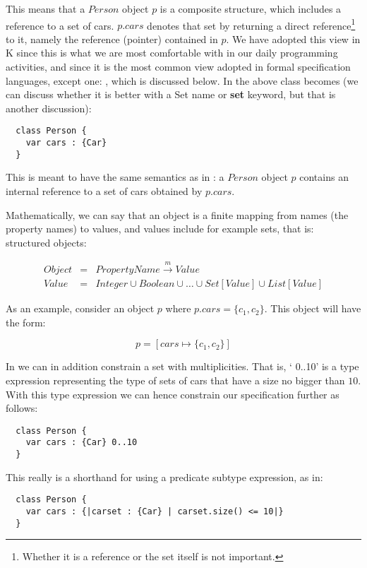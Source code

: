 \documentclass{llncs}
\begin{document}
\noindent
This means that a $Person$ object $p$ is a composite structure, which includes 
a reference to a set of cars. $p.cars$ denotes that set by returning a direct reference\footnote{Whether it is a reference or the set itself is not important.} to it, namely the reference (pointer) contained in $p$. 
We have adopted this view in K since this is what we are most comfortable with in our daily  programming activities, and since it is the most common
view adopted in formal specification languages, except one: \alloy{}, 
which is discussed below. In \klang{} the above class becomes (we can discuss whether it is better with a Set name or {\bf set} keyword, but that is another discussion):

\sk
\begin{lstlisting}
  class Person {
    var cars : {Car}
  }
\end{lstlisting}

\noindent
This is meant to have the same semantics as in \scala: a $Person$ object $p$ contains an internal reference to a set of cars obtained by $p.cars$. 

Mathematically, we can say that an object is a finite mapping from names (the property names) to values, and values include for example sets, that is: structured objects:

\begin{eqnarray}
  Object &=& PropertyName \stackrel{m}{\rightarrow} Value\\
  Value &=& Integer \cup Boolean \cup \ldots \cup Set[Value] \cup List[Value]
\end{eqnarray}
  
\noindent  
As an example, consider an object $p$ where $p.cars = \{c_1,c_2\}$. This object 
will have the form:

\[
p = [cars \mapsto \{c_1,c_2\}]
\]

In \klang{} we can in addition constrain a set with multiplicities.
That is, `{ 0..10}' is a type expression representing
the type of sets of cars that have a size no bigger than $10$. With this type expression we can hence constrain our \klang{} specification 
further as follows:

\sk
\begin{lstlisting}
  class Person {
    var cars : {Car} 0..10
  }
\end{lstlisting}

\noindent This really is a shorthand for using a predicate 
subtype expression, as in:

\sk
\begin{lstlisting}
  class Person {
    var cars : {|carset : {Car} | carset.size() <= 10|}
  }
\end{lstlisting}
\end{document}
